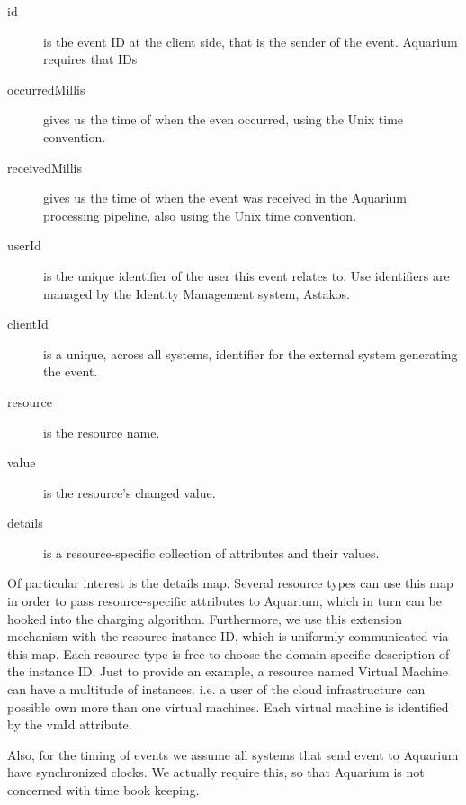 \documentclass[preprint,10pt]{sigplanconf}
\begin{document}
\begin{description}
\item[id] is the event \textsf{ID} at the client side, that is the sender of the event. Aquarium requires that \textsf{IDs}

\item[occurredMillis] gives us the time of when the even occurred, using the Unix time convention.

\item[receivedMillis] gives us the time of when the event was received in the Aquarium processing pipeline, also using the Unix time convention.

\item[userId] is the unique identifier of the user this event relates to. Use identifiers are managed by the Identity Management system, Astakos.

\item[clientId] is a unique, across all systems, identifier for the external system generating the event.

\item[resource] is the resource name.

\item[value] is the resource's changed value.

\item[details] is a resource-specific collection of  attributes and their values.
\end{description}

Of particular interest is the \textsf{details} map. Several resource types can use this map in order to pass resource-specific attributes to Aquarium, which in turn can be hooked into the charging algorithm. Furthermore, we use this extension mechanism with the resource instance \textsf{ID}, which is uniformly communicated via this map. Each resource type is free to choose the domain-specific description of the instance \textsf{ID}. Just to provide an example, a resource named \textsf{Virtual Machine} can have a multitude of instances. i.e. a user of the cloud infrastructure can possible own more than one virtual machines. Each virtual machine is identified by the \textsf{vmId} attribute.

Also, for the timing of events we assume all systems that send event to Aquarium have synchronized clocks. We actually require this, so that Aquarium is not concerned with time book keeping.
\end{document}
